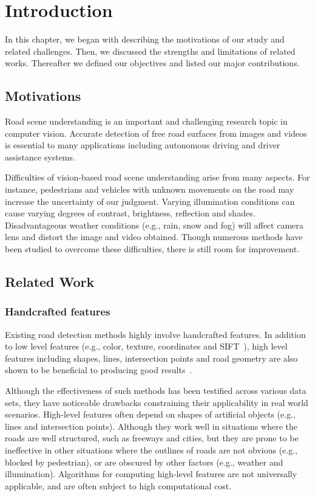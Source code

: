 
\chapter{Introduction}
\label{cha:intro}
In this chapter, we began with describing the motivations of our study and related challenges. Then, we discussed the strengths and limitations of related works. Thereafter we defined our objectives and listed our major contributions.

\section{Motivations}
\label{sec:Motivations}
Road scene understanding is an important and challenging research topic in computer vision. Accurate detection of free road surfaces from images and videos is essential to many applications including autonomous driving and driver assistance systems.

Difficulties of vision-based road scene understanding arise from many aspects. For instance, pedestrians and vehicles with unknown movements on the road may increase the uncertainty of our judgment. Varying illumination conditions can cause varying degrees of contrast, brightness, reflection and shades. Disadvantageous weather conditions (e.g., rain, snow and fog) will affect camera lens and distort the image and video obtained. Though numerous methods have been studied to overcome these difficulties, there is still room for improvement.

\section{Related Work}
\label{sec:Related Work}

\subsection{Handcrafted features}
\label{sec:Handcrafted features}
Existing road detection methods highly involve handcrafted features. In addition to low level features (e.g., color, texture, coordinates and SIFT~\cite{lowe1999object}), high level features including shapes, lines, intersection points and road geometry are also shown to be beneficial to producing good results~\cite{alvarez2014combining}.

Although the effectiveness of such methods has been testified across various data sets, they have noticeable drawbacks constraining their applicability in real world scenarios. High-level features often depend on shapes of artificial objects (e.g., lines and intersection points). Although they work well in situations where the roads are well structured, such as freeways and cities, but they are prone to be ineffective in other situations where the outlines of roads are not obvious (e.g., blocked by pedestrian), or are obscured by other factors (e.g., weather and illumination). Algorithms for computing high-level features are not universally applicable, and are often subject to high computational cost.  

